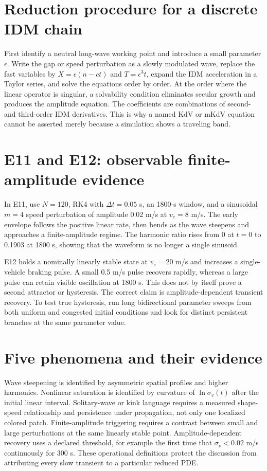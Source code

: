\documentclass[11pt,a4paper,openany]{book}
\numberwithin{equation}{chapter}
\numberwithin{figure}{chapter}
\numberwithin{table}{chapter}
\begin{document}
\section{Reduction procedure for a discrete IDM chain}
First identify a neutral long-wave working point and introduce a small parameter $\epsilon$. Write the gap or speed perturbation as a slowly modulated wave, replace the fast variables by $X=\epsilon(n-c t)$ and $T=\epsilon^3t$, expand the IDM acceleration in a Taylor series, and solve the equations order by order. At the order where the linear operator is singular, a solvability condition eliminates secular growth and produces the amplitude equation. The coefficients are combinations of second- and third-order IDM derivatives. This is why a named KdV or mKdV equation cannot be asserted merely because a simulation shows a traveling band.

\section{E11 and E12: observable finite-amplitude evidence}
In E11, use $N=120$, RK4 with $\Delta t=0.05$ s, an 1800-s window, and a sinusoidal $m=4$ speed perturbation of amplitude 0.02 m/s at $v_e=8$ m/s. The early envelope follows the positive linear rate, then bends as the wave steepens and approaches a finite-amplitude regime. The harmonic ratio rises from 0 at $t=0$ to 0.1903 at 1800 s, showing that the waveform is no longer a single sinusoid.

E12 holds a nominally linearly stable state at $v_e=20$ m/s and increases a single-vehicle braking pulse. A small 0.5 m/s pulse recovers rapidly, whereas a large pulse can retain visible oscillation at 1800 s. This does not by itself prove a second attractor or hysteresis. The correct claim is amplitude-dependent transient recovery. To test true hysteresis, run long bidirectional parameter sweeps from both uniform and congested initial conditions and look for distinct persistent branches at the same parameter value.

\section{Five phenomena and their evidence}
Wave steepening is identified by asymmetric spatial profiles and higher harmonics. Nonlinear saturation is identified by curvature of $\ln\sigma_v(t)$ after the initial linear interval. Solitary-wave or kink language requires a measured shape-speed relationship and persistence under propagation, not only one localized colored patch. Finite-amplitude triggering requires a contrast between small and large perturbations at the same linearly stable point. Amplitude-dependent recovery uses a declared threshold, for example the first time that $\sigma_v<0.02$ m/s continuously for 300 s. These operational definitions protect the discussion from attributing every slow transient to a particular reduced PDE.
\end{document}
